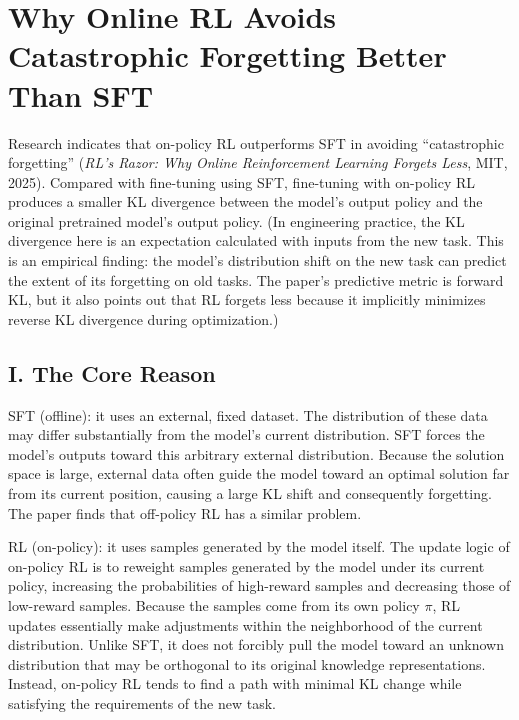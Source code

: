 \setcounter{section}{8}

\hypertarget{why-online-rl-avoids-catastrophic-forgetting-better-than-sft}{%
\section{Why Online RL Avoids Catastrophic Forgetting Better Than SFT}\label{why-online-rl-avoids-catastrophic-forgetting-better-than-sft}}

Research indicates that on-policy RL outperforms SFT in avoiding ``catastrophic forgetting'' (\emph{RL's Razor: Why Online Reinforcement Learning Forgets Less}, MIT, 2025). Compared with fine-tuning using SFT, fine-tuning with on-policy RL produces a smaller KL divergence between the model's output policy and the original pretrained model's output policy. (In engineering practice, the KL divergence here is an expectation calculated with inputs from the new task. This is an empirical finding: the model's distribution shift on the new task can predict the extent of its forgetting on old tasks. The paper's predictive metric is forward KL, but it also points out that RL forgets less because it implicitly minimizes reverse KL divergence during optimization.)

\hypertarget{i.-the-core-reason}{%
\subsection{I. The Core Reason}\label{i.-the-core-reason}}

SFT (offline): it uses an external, fixed dataset. The distribution of these data may differ substantially from the model's current distribution. SFT forces the model's outputs toward this arbitrary external distribution. Because the solution space is large, external data often guide the model toward an optimal solution far from its current position, causing a large KL shift and consequently forgetting. The paper finds that off-policy RL has a similar problem.

RL (on-policy): it uses samples generated by the model itself. The update logic of on-policy RL is to reweight samples generated by the model under its current policy, increasing the probabilities of high-reward samples and decreasing those of low-reward samples. Because the samples come from its own policy \(\pi\), RL updates essentially make adjustments within the neighborhood of the current distribution. Unlike SFT, it does not forcibly pull the model toward an unknown distribution that may be orthogonal to its original knowledge representations. Instead, on-policy RL tends to find a path with minimal KL change while satisfying the requirements of the new task.

